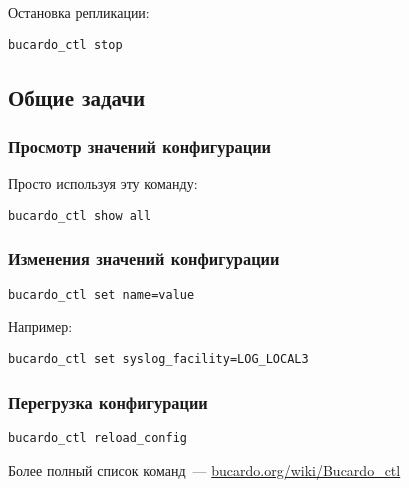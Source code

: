 Остановка репликации:
\begin{lstlisting}[label=lst:bucardo12,caption=Остановка репликации]
bucardo_ctl stop
\end{lstlisting}

\subsection{Общие задачи}

\subsubsection{Просмотр значений конфигурации}
Просто используя эту команду:
\begin{lstlisting}[label=lst:bucardo13,caption=Просмотр значений конфигурации]
bucardo_ctl show all
\end{lstlisting}

\subsubsection{Изменения значений конфигурации}
\begin{lstlisting}[label=lst:bucardo14,caption=Изменения значений конфигурациии]
bucardo_ctl set name=value
\end{lstlisting}

Например:
\begin{lstlisting}[label=lst:bucardo15,caption=Изменения значений конфигурации]
bucardo_ctl set syslog_facility=LOG_LOCAL3
\end{lstlisting}

\subsubsection{Перегрузка конфигурации}
\begin{lstlisting}[label=lst:bucardo16,caption=Перегрузка конфигурации]
bucardo_ctl reload_config
\end{lstlisting}

Более полный список команд~--- \href{http://bucardo.org/wiki/Bucardo\_ctl}{bucardo.org/wiki/Bucardo\_ctl}

